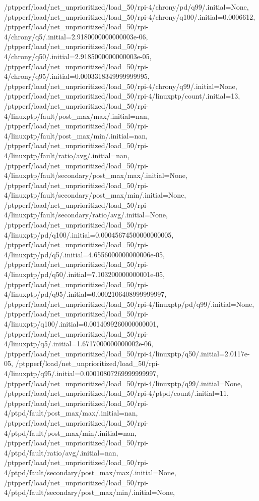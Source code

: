 {    /ptpperf/load/net_unprioritized/load_50/rpi-4/chrony/pd/q99/.initial=None,
    /ptpperf/load/net_unprioritized/load_50/rpi-4/chrony/q100/.initial=0.0006612,
    /ptpperf/load/net_unprioritized/load_50/rpi-4/chrony/q5/.initial=2.9180000000000003e-06,
    /ptpperf/load/net_unprioritized/load_50/rpi-4/chrony/q50/.initial=2.9185000000000003e-05,
    /ptpperf/load/net_unprioritized/load_50/rpi-4/chrony/q95/.initial=0.0003318349999999995,
    /ptpperf/load/net_unprioritized/load_50/rpi-4/chrony/q99/.initial=None,
    /ptpperf/load/net_unprioritized/load_50/rpi-4/linuxptp/count/.initial=13,
    /ptpperf/load/net_unprioritized/load_50/rpi-4/linuxptp/fault/post_max/max/.initial=nan,
    /ptpperf/load/net_unprioritized/load_50/rpi-4/linuxptp/fault/post_max/min/.initial=nan,
    /ptpperf/load/net_unprioritized/load_50/rpi-4/linuxptp/fault/ratio/avg/.initial=nan,
    /ptpperf/load/net_unprioritized/load_50/rpi-4/linuxptp/fault/secondary/post_max/max/.initial=None,
    /ptpperf/load/net_unprioritized/load_50/rpi-4/linuxptp/fault/secondary/post_max/min/.initial=None,
    /ptpperf/load/net_unprioritized/load_50/rpi-4/linuxptp/fault/secondary/ratio/avg/.initial=None,
    /ptpperf/load/net_unprioritized/load_50/rpi-4/linuxptp/pd/q100/.initial=0.00045674500000000005,
    /ptpperf/load/net_unprioritized/load_50/rpi-4/linuxptp/pd/q5/.initial=4.6556000000000006e-05,
    /ptpperf/load/net_unprioritized/load_50/rpi-4/linuxptp/pd/q50/.initial=7.103200000000001e-05,
    /ptpperf/load/net_unprioritized/load_50/rpi-4/linuxptp/pd/q95/.initial=0.0002106408999999997,
    /ptpperf/load/net_unprioritized/load_50/rpi-4/linuxptp/pd/q99/.initial=None,
    /ptpperf/load/net_unprioritized/load_50/rpi-4/linuxptp/q100/.initial=0.0014099260000000001,
    /ptpperf/load/net_unprioritized/load_50/rpi-4/linuxptp/q5/.initial=1.6717000000000002e-06,
    /ptpperf/load/net_unprioritized/load_50/rpi-4/linuxptp/q50/.initial=2.0117e-05,
    /ptpperf/load/net_unprioritized/load_50/rpi-4/linuxptp/q95/.initial=0.00010807269999999997,
    /ptpperf/load/net_unprioritized/load_50/rpi-4/linuxptp/q99/.initial=None,
    /ptpperf/load/net_unprioritized/load_50/rpi-4/ptpd/count/.initial=11,
    /ptpperf/load/net_unprioritized/load_50/rpi-4/ptpd/fault/post_max/max/.initial=nan,
    /ptpperf/load/net_unprioritized/load_50/rpi-4/ptpd/fault/post_max/min/.initial=nan,
    /ptpperf/load/net_unprioritized/load_50/rpi-4/ptpd/fault/ratio/avg/.initial=nan,
    /ptpperf/load/net_unprioritized/load_50/rpi-4/ptpd/fault/secondary/post_max/max/.initial=None,
    /ptpperf/load/net_unprioritized/load_50/rpi-4/ptpd/fault/secondary/post_max/min/.initial=None,
}
